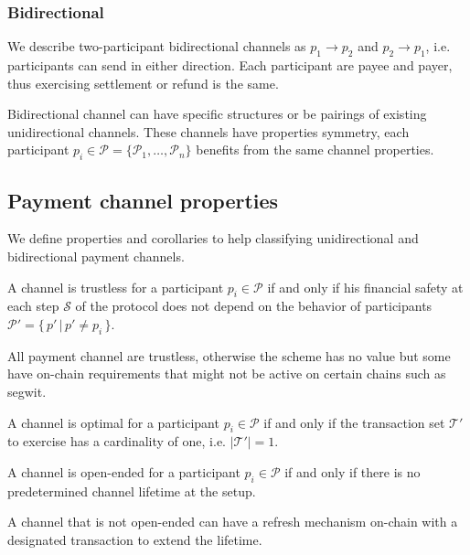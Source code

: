 \documentclass{llncs}
\begin{document}
\subsubsection{Bidirectional}
We describe two-participant bidirectional channels as $p_1 \rightarrow p_2$ and  $p_2 \rightarrow p_1$, i.e. participants can send in either direction. Each participant are payee and payer, thus exercising settlement or refund is the same.

Bidirectional channel can have specific structures or be pairings of existing unidirectional channels. These channels have properties symmetry, each participant $p_i \in \mathcal{P} = \{\mathcal{P}_1, \dots, \mathcal{P}_n\}$ benefits from the same channel properties.

\subsection{Payment channel properties}

We define properties and corollaries to help classifying unidirectional and bidirectional payment channels.

\begin{definition}[Trustless] A channel is trustless for a participant $p_i \in \mathcal{P}$ if and only if his financial safety at each step $\mathcal{S}$ of the protocol does not depend on the behavior of participants $\mathcal{P}' = \{\, p' \, | \, p' \neq p_i \, \}$.
\end{definition}

All payment channel are trustless, otherwise the scheme has no value but some have on-chain requirements that might not be active on certain chains such as \gls{segwit}.

\begin{definition}[Optimal] A channel is optimal for a participant $p_i \in \mathcal{P}$ if and only if the transaction set $\mathcal{T'}$ to exercise has a cardinality of one, i.e. $|\mathcal{T'}| = 1$.
\end{definition}

\begin{definition} A channel is open-ended for a participant $p_i \in \mathcal{P}$ if and only if there is no predetermined channel lifetime at the setup.
\end{definition}

A channel that is not open-ended can have a refresh mechanism on-chain with a designated transaction to extend the lifetime.
\end{document}
